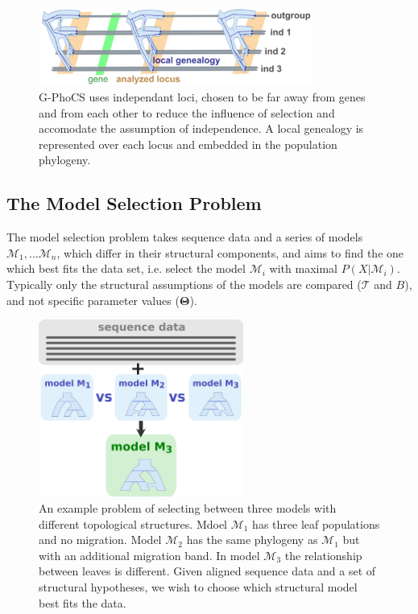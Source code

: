 \documentclass[11pt]{article}
\newcommand{\vect}[1]{\boldsymbol{\mathbf{#1}}}
\newcommand{\M}{\mathcal{M}}
\newcommand{\Tr}{\mathcal{T}}
\newcommand{\T}{\vect{\Theta}}
\newcommand{\1}{\mathbbm{1}}
\newcommand{\gp}{G-PhoCS }
\begin{document}
% 

\begin{figure}[h]
\centering
\includegraphics[width=0.8\textwidth]
{multiple_loci_across_sequence}
\captionsetup{width=.8\textwidth}
\caption{\gp uses independant loci, chosen to be far away from genes and from each other to reduce the influence of selection and accomodate the assumption of independence. A local genealogy is represented over each locus and embedded in the population phylogeny.}
\label{fig:multiple_loci_across_sequence}
\end{figure}


\subsection{The Model Selection Problem}

The model selection problem takes sequence data and a series of models $\M_1,... \M_n$, which differ in their structural components, and aims to find the one which best fits the data set, i.e. select the model $\M_i$ with maximal $P(X|\M_i)$. Typically only the structural assumptions of the models are compared ($\Tr$ and $B$), and not specific parameter values ($\T$).


\begin{figure}[h]
\centering
\includegraphics[width=0.6\textwidth]
{by_ilan/probgen_3_model_selection}
\captionsetup{width=.8\textwidth}
\caption{An example problem of selecting between three models with different topological structures. Mdoel $\M_1$ has three leaf populations and no migration. Model $\M_2$ has the same phylogeny as $\M_1$ but with an additional migration band. In model $\M_3$ the relationship between leaves is different. 
%
Given aligned sequence data and a set of structural hypotheses, we wish to choose which structural model best fits the data.}
\label{fig:model_A__OR__model_b}
\end{figure}
\end{document}
